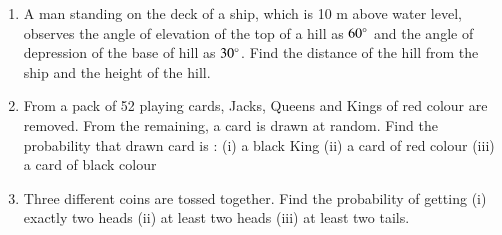 \documentclass[book,11pt]{IEEEtran}
\renewcommand\thesection{\arabic{section}}
\begin{document}
\begin{enumerate}[label=\thesection.\arabic*.,ref=\thesection.\theenumi]
\item  A man standing on the deck of a ship, which is 10 m above water level, observes the angle of elevation of the top of a hill as $ 60\degree $ and the angle of depression of the base of hill as $ 30 \degree $. Find the distance of the hill from the ship and the height of the hill.\\
\item From a pack of 52 playing cards, Jacks, Queens and Kings of red colour are removed. From the remaining, a card is drawn at random. Find the probability that drawn card is :
(i) a black King (ii) a card of red colour (iii) a card of black colour\\
\item  Three different coins are tossed together. Find the probability of getting (i) exactly two heads (ii) at least two heads (iii) at least two tails.\\
\end{enumerate}
\end{document}
